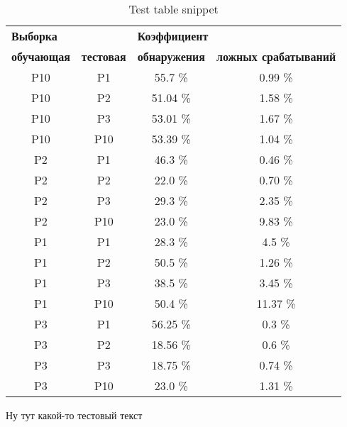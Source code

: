 \documentclass[12pt,a4paper]{article}
\begin{document}
\begin{table}
	\caption{Test table snippet}
	\label{table:training_test}
	\begin{center}
		\begin{tabular}{|c|c|c|c|}
		\hline

		\hline
		\multicolumn{2}{|l|}{\textbf{\hspace{35pt}Выборка}} & \multicolumn{2}{|l|}{\textbf{\hspace{45pt}Коэффициент}}\\

		\multicolumn{1}{|c|}{\textbf{обучающая}} & \multicolumn{1}{|c|}{\textbf{тестовая}} & \multicolumn{1}{|c|}{\textbf{обнаружения}} & \multicolumn{1}{|c|}{\textbf{ложных срабатываний}} \\
		\hline P10 & P1  & 55.7   \% & 0.99  \% \\
		\hline P10 & P2  & 51.04  \% & 1.58  \% \\
		\hline P10 & P3  & 53.01  \% & 1.67  \% \\
		\hline P10 & P10 & 53.39  \% & 1.04  \% \\
		\hline P2  & P1  & 46.3   \% & 0.46  \% \\
		\hline P2  & P2  & 22.0   \% & 0.70  \% \\
		\hline P2  & P3  & 29.3   \% & 2.35  \% \\
		\hline P2  & P10 & 23.0   \% & 9.83  \% \\
		\hline P1  & P1  & 28.3   \% & 4.5  \% \\
		\hline P1  & P2  & 50.5   \% & 1.26  \% \\
		\hline P1  & P3  & 38.5   \% & 3.45  \% \\
		\hline P1  & P10 & 50.4   \% & 11.37 \% \\
		\hline P3  & P1  & 56.25  \% & 0.3  \% \\
		\hline P3  & P2  & 18.56  \% & 0.6  \% \\
		\hline P3  & P3  & 18.75  \% & 0.74  \% \\
		\hline P3  & P10 & 23.0   \% & 1.31  \% \\
		\hline

		\hline
		\end{tabular}
	\end{center}
\end{table}

Ну тут какой-то тестовый текст
\end{document}
